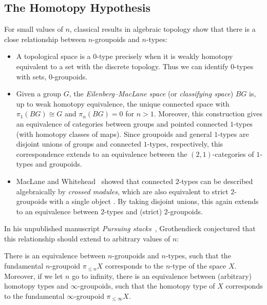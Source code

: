 \documentclass[a4paper,11pt]{article}
\begin{document}
\subsection{The Homotopy Hypothesis}\label{subsec:hohyp}
For small values of $n$, classical results in algebraic topology show
that there is a close relationship between $n$-groupoids and
$n$-types:
\begin{itemize}
\item A topological space is a $0$-type precisely when it is weakly
  homotopy equivalent to a set with the discrete topology. Thus we can
  identify $0$-types with sets, \ie{} $0$-groupoids.
\item Given a group $G$, the \emph{Eilenberg--MacLane space}
  \cite{EML} (or
  \emph{classifying space}) $BG$ is, up to weak homotopy
  equivalence, the unique connected space with $\pi_{1}(BG) \cong G$
  and $\pi_{n}(BG) = 0$ for $n > 1$. Moreover, this construction gives
  an equivalence of categories between groups and pointed connected
  $1$-types (with homotopy classes of maps). Since groupoids and
  general $1$-types are disjoint unions of groups and connected $1$-types,
  respectively, this correspondence extends to an equivalence between
  the $(2,1)$-categories of $1$-types and groupoids.
\item MacLane and Whitehead~\cite{MacLaneWhitehead} showed that
  connected $2$-types can be described algebraically by \emph{crossed
    modules}, which are also equivalent to strict $2$-groupoids with a
  single object \cite{BrownSpencer}. By taking disjoint unions, this
  again extends to an equivalence between $2$-types and (strict)
  $2$-groupoids.
\end{itemize}
In his unpublished manuscript \emph{Pursuing stacks}~\cite{GrothendieckStacks}, Grothendieck conjectured that this
relationship should extend to arbitrary values of $n$:
\begin{conjecture}
  There is an equivalence between $n$-groupoids and $n$-types, such
  that the fundamental $n$-groupoid $\pi_{\leq n}X$ corresponds to the
  $n$-type of the space $X$. Moreover, if we let $n$ go to infinity,
  there is an equivalence between (arbitrary) homotopy types and
  $\infty$-groupoids, such that the homotopy type of $X$ corresponds
  to the fundamental $\infty$-groupoid $\pi_{\leq \infty}X$.
\end{conjecture}
\end{document}
